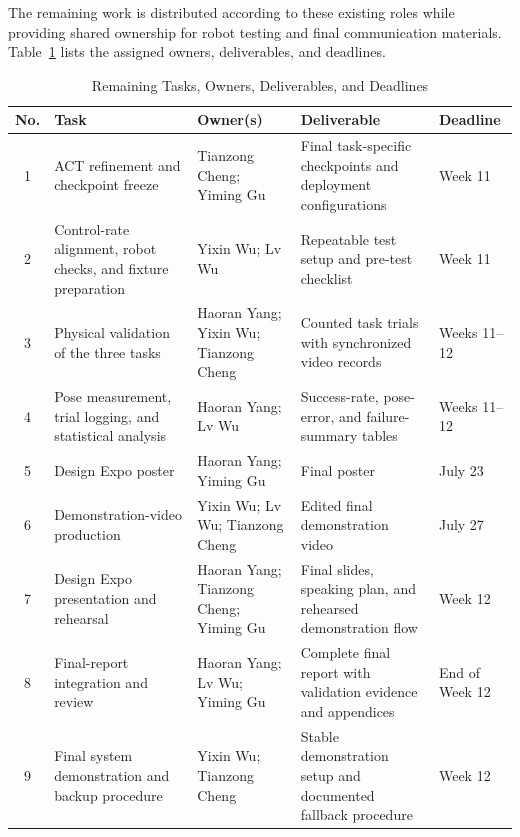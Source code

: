 \documentclass[12pt, letterpaper]{article}
\newcommand{\drone}[1]{{\color{gray}#1}}
\begin{document}
The remaining work is distributed according to these existing roles while
providing shared ownership for robot testing and final communication materials.
Table~\ref{tab:remaining-tasks} lists the assigned owners, deliverables, and
deadlines.

\begin{table}[H]
\centering
\caption{Remaining Tasks, Owners, Deliverables, and Deadlines}
\label{tab:remaining-tasks}
\scriptsize
\setlength{\tabcolsep}{2.5pt}
\renewcommand{\arraystretch}{1.02}
\begin{tabularx}{\textwidth}{c >{\raggedright\arraybackslash}p{2.85cm}
>{\raggedright\arraybackslash}p{3.0cm} >{\raggedright\arraybackslash}X
>{\raggedright\arraybackslash}p{1.35cm}}
\toprule
\textbf{No.} & \textbf{Task} & \textbf{Owner(s)} & \textbf{Deliverable} &
\textbf{Deadline} \\
\midrule
1 & ACT refinement and checkpoint freeze & Tianzong Cheng; Yiming Gu & Final
task-specific checkpoints and deployment configurations & Week 11 \\
2 & Control-rate alignment, robot checks, and fixture preparation & Yixin Wu;
Lv Wu & Repeatable test setup and pre-test checklist & Week 11 \\
3 & Physical validation of the three tasks & Haoran Yang; Yixin Wu; Tianzong
Cheng & Counted task trials with synchronized video records & Weeks 11--12 \\
4 & Pose measurement, trial logging, and statistical analysis & Haoran Yang;
Lv Wu & Success-rate, pose-error, and failure-summary tables & Weeks 11--12 \\
5 & Design Expo poster & Haoran Yang; Yiming Gu & Final poster & July 23 \\
6 & Demonstration-video production & Yixin Wu; Lv Wu; Tianzong Cheng & Edited
final demonstration video & July 27 \\
7 & Design Expo presentation and rehearsal & Haoran Yang; Tianzong Cheng;
Yiming Gu & Final slides, speaking plan, and rehearsed demonstration flow &
Week 12 \\
8 & Final-report integration and review & Haoran Yang; Lv Wu; Yiming Gu &
Complete final report with validation evidence and appendices & End of Week 12 \\
9 & Final system demonstration and backup procedure & Yixin Wu; Tianzong Cheng &
Stable demonstration setup and documented fallback procedure & Week 12 \\
\bottomrule
\end{tabularx}
\end{table}
%
\end{document}
